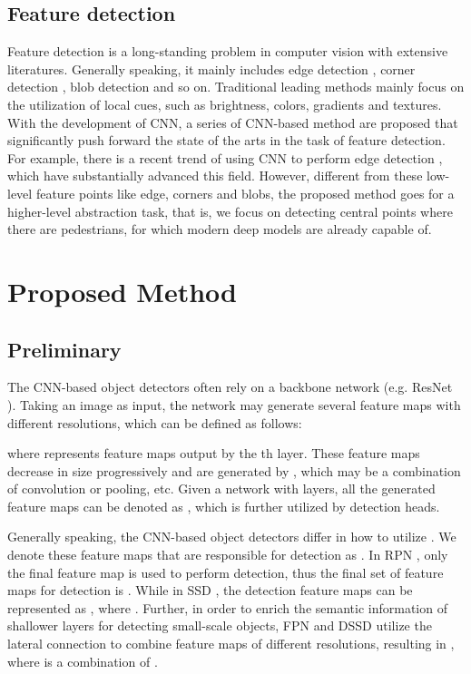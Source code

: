 \subsection{Feature detection}
Feature detection is a long-standing problem in computer vision with extensive literatures. Generally speaking, it mainly includes edge detection \cite{canny1986computational,sobel1972camera}, corner detection \cite{rosten2006machine,rosten2010faster}, blob detection \cite{matas2004robust,deng2007principal} and so on.
Traditional leading methods \cite{canny1986computational,sobel1972camera} mainly focus on the utilization of local cues, such as brightness, colors, gradients and textures. With the development of CNN, a series of CNN-based method are proposed that significantly push forward the state of the arts in the task of feature detection. For example, there is a recent trend of using CNN to perform edge detection \cite{shen2015deepcontour,xie2017holistically,bertasius2015deepedge,liu2017richer}, which have substantially advanced this field.
However, different from these low-level feature points like edge, corners and blobs, the proposed method goes for a higher-level abstraction task, that is, we focus on detecting central points where there are pedestrians, for which modern deep models are already capable of.

\section{Proposed Method}
\subsection{Preliminary}
The CNN-based object detectors often rely on a backbone network (e.g. ResNet \cite{he2016deep}). Taking an image  as input, the network may generate several feature maps with different resolutions, which can be defined as follows:

where  represents feature maps output by the th layer. These feature maps decrease in size progressively and are generated by , which may be a combination of convolution or pooling, etc. Given a network with  layers, all the generated feature maps can be denoted as , which is further utilized by detection heads.

Generally speaking, the CNN-based object detectors differ in how to utilize . We denote these feature maps that are responsible for detection as . In RPN \cite{ren2015faster}, only the final feature map  is used to perform detection, thus the final set of feature maps for detection is . While in SSD \cite{liu2016ssd}, the detection feature maps can be represented as , where . Further, in order to enrich the semantic information of shallower layers for detecting small-scale objects, FPN \cite{lin2016feature} and DSSD \cite{fu2017dssd} utilize the lateral connection to combine feature maps of different resolutions, resulting in , where  is a combination of .

